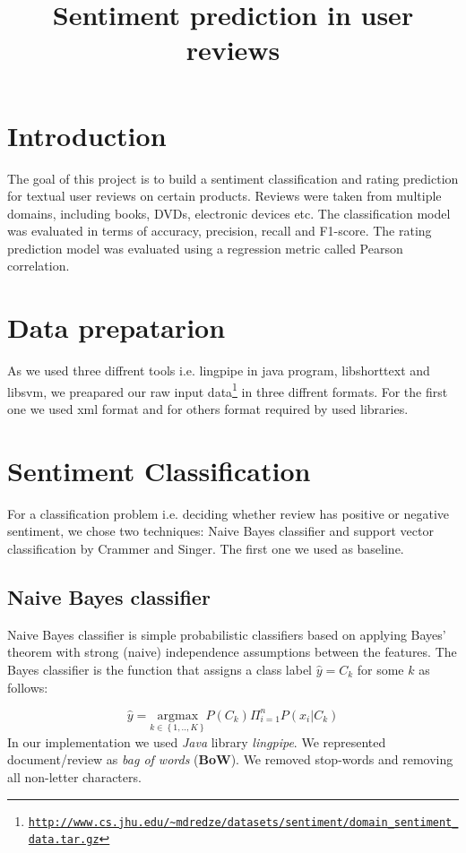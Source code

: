 \documentclass[10pt, a4paper]{article}
\title{Sentiment prediction in user reviews}
\begin{document}
\maketitleabstract

\section{Introduction}

The goal of this project is to build a sentiment classification and rating prediction for textual user reviews on certain products.  Reviews were taken from multiple domains, including books, DVDs, electronic devices etc.  The classification model was evaluated in terms of accuracy, precision, recall and F1-score. The rating prediction model was evaluated using a regression metric called Pearson correlation.



\section{Data prepatarion}

As we used three diffrent tools i.e. lingpipe in java program, libshorttext and libsvm, we preapared our raw input data\footnote{\texttt{\url{http://www.cs.jhu.edu/~mdredze/datasets/sentiment/domain_sentiment_data.tar.gz}}} in three diffrent formats. For the first one we used xml format and for others format required by used libraries. 


\section{Sentiment Classification}

For a classification problem i.e. deciding whether review has positive or negative sentiment, we chose two techniques: Naive Bayes classifier and support vector classification by Crammer and Singer. The first one we used as baseline.

\subsection{Naive Bayes classifier}

Naive Bayes classifier is simple probabilistic classifiers based on applying Bayes' theorem with strong (naive) independence assumptions between the features. The Bayes classifier is the function that assigns a class label $\hat{y} = C_{k}$ for some $k$ as follows:

\begin{equation}\label{eq:bayes}
\hat{y} = \underset{k\in\left\lbrace 1, .., K\right\rbrace } {\mathrm{argmax}} P(C_{k})\Pi_{i=1}^{n} P(x_{i} | C_{k})
\end{equation}
In our implementation we used \emph{Java} library \emph{lingpipe}. We represented document\slash review as \emph{bag of words} (\textbf{BoW}). We removed stop-words and removing all non-letter characters.
\end{document}
